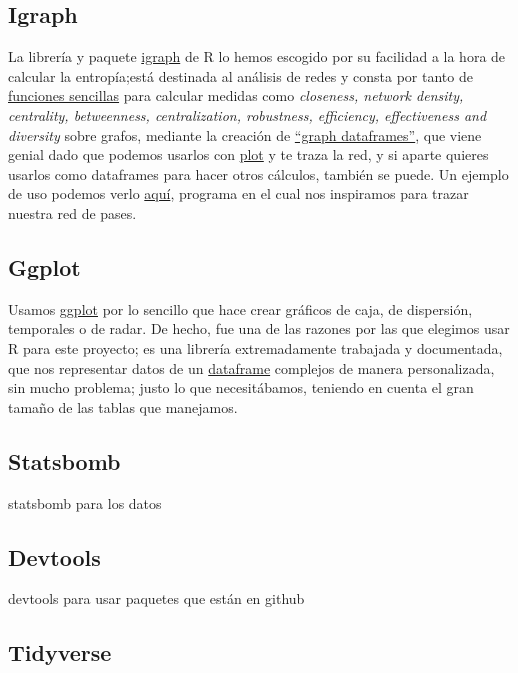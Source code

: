 \subsection{Igraph}
La librería y paquete \href{https://igraph.org/r/}{igraph} de R lo hemos escogido por su facilidad a la hora de 
calcular la entropía;está destinada al análisis de redes y consta por tanto de \href{https://kateto.net/netscix2016.html}{funciones sencillas} para calcular 
medidas como \textit{closeness, network density, centrality, betweenness, centralization, robustness, 
efficiency, effectiveness and diversity} sobre grafos, mediante la 
creación de \href{https://igraph.org/r/doc/graph_from_data_frame.html}{``graph dataframes''}, que viene genial 
dado que podemos usarlos con \href{https://www.rdocumentation.org/packages/graphics/versions/3.6.2/topics/plot}{plot} 
y te traza la red, y si aparte quieres usarlos como dataframes para hacer otros cálculos, también se puede. Un ejemplo 
de uso podemos verlo \href{https://github.com/JJ/venice-patrician-social-network/blob/main/patrician-social-network.R}{aquí}, 
programa en el cual nos inspiramos para trazar nuestra red de pases.

\subsection{Ggplot}
Usamos \href{https://ggplot2.tidyverse.org/}{ggplot} por lo sencillo que hace crear gráficos de caja, de dispersión, 
temporales o de radar. De hecho, fue una de las razones por las que elegimos usar R para este proyecto; es una 
librería extremadamente trabajada y documentada, que nos representar datos de un 
\href{https://www.rdocumentation.org/packages/base/versions/3.6.2/topics/data.frame}{dataframe} complejos de 
manera personalizada, sin mucho problema; justo lo que necesitábamos, teniendo en cuenta el gran tamaño de las 
tablas que manejamos.

\subsection{Statsbomb}
statsbomb para 
los datos

\subsection{Devtools}
devtools para usar paquetes que están en github

\subsection{Tidyverse}

